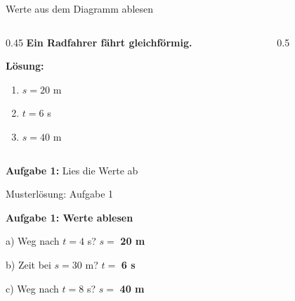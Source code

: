 \documentclass[aspectratio=169,11pt]{beamer}
\begin{document}
\begin{frame}{Werte aus dem Diagramm ablesen}
    \begin{columns}
        \begin{column}{0.45\textwidth}
            \textbf{Ein Radfahrer fährt gleichförmig.}

            \vspace{0.8em}
            \textcolor{loesung}{\textbf{Lösung:}
            \begin{enumerate}
                \item[a)] $s = 20$ m
                \item[b)] $t = 6$ s
                \item[c)] $s = 40$ m
            \end{enumerate}}
        \end{column}
        \begin{column}{0.5\textwidth}
        \end{column}
    \end{columns}

    \vspace{0.3em}
    \begin{abhinweis}
        \textbf{Aufgabe 1:} Lies die Werte ab
    \end{abhinweis}
\end{frame}

\begin{frame}{Musterlösung: Aufgabe 1}
    \begin{center}
        \begin{mlbox}
            \textbf{Aufgabe 1: Werte ablesen}

            \vspace{0.5em}
            a) Weg nach $t = 4$ s? \quad $s =$ \textcolor{loesung}{\textbf{20 m}}

            \vspace{0.3em}
            b) Zeit bei $s = 30$ m? \quad $t =$ \textcolor{loesung}{\textbf{6 s}}

            \vspace{0.3em}
            c) Weg nach $t = 8$ s? \quad $s =$ \textcolor{loesung}{\textbf{40 m}}
        \end{mlbox}
    \end{center}
\end{frame}
\end{document}
